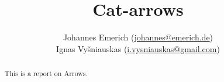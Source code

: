 \documentclass[12pt,a4paper,titlepage]{scrreprt}
\title{Cat-arrows}
\author{%
    Johannes Emerich
        (\href{mailto:Johannes@emerich.de}{johannes@emerich.de})\\
    Ignas Vyšniauskas
        (\href{mailto:i.vysniauskas@gmail.com}{i.vysniauskas@gmail.com})
}
\date{}
\begin{document}
\maketitle

\begin{abstract}
    This is a report on Arrows.
\end{abstract}



\printbibliography
\end{document}
